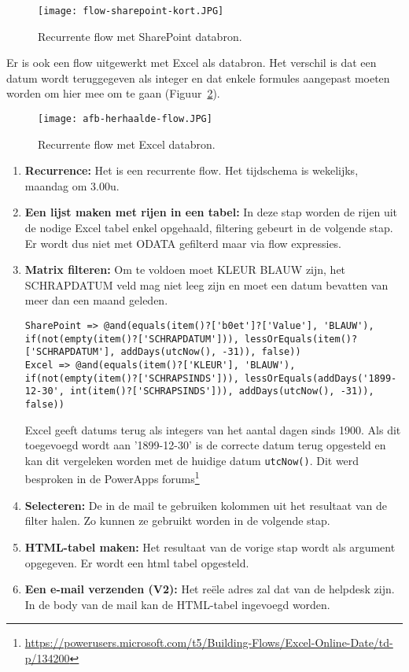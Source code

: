 \begin{figure}[h!]
    \centering
    \texttt{[image: flow-sharepoint-kort.JPG]}
    \caption{Recurrente flow met SharePoint databron.}
    \label{fig:flow-sharepoint-kort}
\end{figure}

Er is ook een flow uitgewerkt met Excel als databron. Het verschil is dat een datum wordt teruggegeven als integer en dat enkele formules aangepast moeten worden om hier mee om te gaan (Figuur~\ref{fig:recurrent-flow-excel}). 

\begin{figure}[h!]
    \centering
    \texttt{[image: afb-herhaalde-flow.JPG]}
    \caption{Recurrente flow met Excel databron.}
    \label{fig:recurrent-flow-excel}
\end{figure}

\begin{enumerate}
    \item \textbf{Recurrence:} Het is een recurrente flow. Het tijdschema is wekelijks, maandag om 3.00u.
    \item \textbf{Een lijst maken met rijen in een tabel:} In deze stap worden de rijen uit de nodige Excel tabel enkel opgehaald, filtering gebeurt in de volgende stap. Er wordt dus niet met ODATA gefilterd maar via flow expressies.
    \item \textbf{Matrix filteren:} Om te voldoen moet KLEUR BLAUW zijn, het SCHRAPDATUM veld mag niet leeg zijn en moet een datum bevatten van meer dan een maand geleden.
\begin{lstlisting}
SharePoint => @and(equals(item()?['b0et']?['Value'], 'BLAUW'), if(not(empty(item()?['SCHRAPDATUM'])), lessOrEquals(item()?['SCHRAPDATUM'], addDays(utcNow(), -31)), false))
Excel => @and(equals(item()?['KLEUR'], 'BLAUW'), if(not(empty(item()?['SCHRAPSINDS'])), lessOrEquals(addDays('1899-12-30', int(item()?['SCHRAPSINDS'])), addDays(utcNow(), -31)), false))
\end{lstlisting}
    Excel geeft datums terug als integers van het aantal dagen sinds 1900. Als dit toegevoegd wordt aan '1899-12-30' is de correcte datum terug opgesteld en kan dit vergeleken worden met de huidige datum \lstinline|utcNow()|. Dit werd besproken in de PowerApps forums\footnote{\url{https://powerusers.microsoft.com/t5/Building-Flows/Excel-Online-Date/td-p/134200}}
    \item \textbf{Selecteren:} De in de mail te gebruiken kolommen uit het resultaat van de filter halen. Zo kunnen ze gebruikt worden in de volgende stap.
    \item \textbf{HTML-tabel maken:} Het resultaat van de vorige stap wordt als argument opgegeven. Er wordt een html tabel opgesteld.
    \item \textbf{Een e-mail verzenden (V2):} Het reële adres zal dat van de helpdesk zijn. In de body van de mail kan de HTML-tabel ingevoegd worden.
\end{enumerate}

